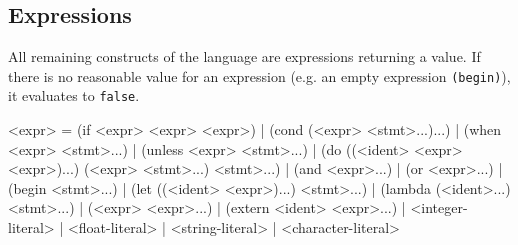 \subsection{Expressions}

All remaining constructs of the language are expressions returning a value. If
there is no reasonable value for an expression (e.g. an empty expression
\texttt{(begin)}), it evaluates to \texttt{false}.

\begin{gram}
<expr>        = (if <expr> <expr> <expr>)
              | (cond (<expr> <stmt>...)...)
              | (when <expr> <stmt>...)
              | (unless <expr> <stmt>...)
              | (do ((<ident> <expr> <expr>)...) (<expr> <stmt>...) <stmt>...)
              | (and <expr>...)
              | (or <expr>...)
              | (begin <stmt>...)
              | (let ((<ident> <expr>)...) <stmt>...)
              | (lambda (<ident>...) <stmt>...)
              | (<expr> <expr>...)
              | (extern <ident> <expr>...)
              | <integer-literal>
              | <float-literal>
              | <string-literal>
              | <character-literal>
\end{gram}

